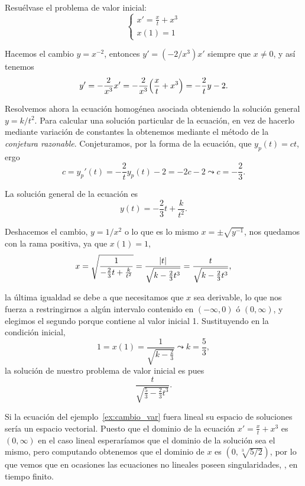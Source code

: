 \documentclass[../ecuaciones_diferenciales.tex]{subfiles}
\begin{document}
\begin{example}\label{ex:cambio_var}
	Resuélvase el problema de valor inicial:
	\[\begin{cases}
			x' = \frac{x}{t} + x^3 \\
			x(1) = 1
		\end{cases}\]
\end{example}

\begin{solution}
	Hacemos el cambio \(y = x^{-2}\), entonces \(y' = (-2/x^3) x'\) siempre que
	\(x \neq 0\), y así tenemos
	\[y' = -\frac{2}{x^3} x' = -\frac{2}{x^3}\parens{\frac{x}{t} + x^3} =
		-\frac{2}{t}y - 2.\]

	Resolvemos ahora la ecuación homogénea asociada obteniendo la solución
	general \(y = k/t^2\). Para calcular una solución particular de la
	ecuación, en vez de hacerlo mediante variación de constantes la obtenemos
	mediante el método de la \emph{conjetura razonable}. Conjeturamos, por la
	forma de la ecuación, que \(y_p(t) = ct\), ergo
	\[c = y_p'(t) = -\frac{2}{t} y_p(t) - 2 = -2c -2
		\leadsto c = -\frac{2}{3}.\]

	La solución general de la ecuación es
	\[y(t) = -\frac{2}{3}t + \frac{k}{t^2}.\]

	Deshacemos el cambio, \(y = 1/x^2\) o lo que es lo mismo
	\(x = \pm \sqrt{y^{-1}}\), nos quedamos con la rama positiva, ya que
	\(x(1) = 1\),
	\[x = \sqrt{\frac{1}{-\frac{2}{3}t + \frac{k}{t^2}}} =
		\frac{\abs{t}}{\sqrt{k - \frac{2}{3}t^3}} = \frac{t}{\sqrt{k -
				\frac{2}{3}t^3}},\]

	la última igualdad se debe a que necesitamos que \(x\) sea derivable, lo que
	nos fuerza a restringirnos a algún intervalo contenido en
	\((-\infty, 0)\) ó \((0, \infty)\), y elegimos el segundo
	porque contiene al valor inicial 1.  Sustituyendo en la condición inicial,
	\[1 = x(1) = \frac{1}{\sqrt{k - \frac{2}{3}}} \leadsto k = \frac{5}{3},\]
	la solución de nuestro problema de valor inicial es pues
	\[\frac{t}{\sqrt{\frac{5}{3} - \frac{2}{3}t^3}}.\]
\end{solution}

\begin{remark}
	Si la ecuación del ejemplo~\ref{ex:cambio_var} fuera lineal su espacio de
	soluciones sería un espacio vectorial. Puesto que el dominio de la ecuación
	\(x' = \frac{x}{t} + x^3\) es \((0, \infty)\) en el caso lineal esperaríamos
	que el dominio de la solución sea el mismo, pero computando obtenemos que el
	dominio de \(x\) es \((0, \sqrt[3]{5/2})\), por lo que vemos que en ocasiones
	las ecuaciones no lineales poseen singularidades, ,
	en tiempo finito.
\end{remark}
\end{document}

